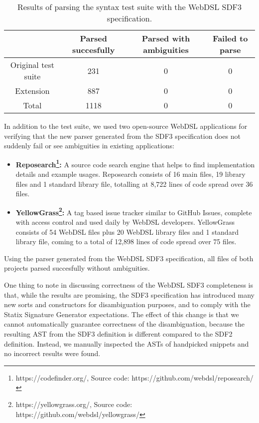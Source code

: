     \begin{table}[h]
      \centering
      \begin{tabular}{ | c || c | c | c | }
        \hline
        & Parsed succesfully & Parsed with ambiguities & Failed to parse \\
        \hline
        Original test suite & 231 & 0 & 0 \\
        \hline
        Extension & 887 & 0 & 0 \\
        \hline\hline
        Total & 1118 & 0 & 0 \\
        \hline
      \end{tabular}
      \caption{\label{tbl:syntax-correctness-suite-results}Results of parsing the syntax test suite with the WebDSL SDF3 specification.}
    \end{table}

    In addition to the test suite, we used two open-source WebDSL applications for verifying that the new parser generated from the SDF3 specification does not suddenly fail or see ambiguities in existing applications:

    \begin{itemize}
      \item \textbf{Reposearch\footnote{https://codefinder.org/, Source code: https://github.com/webdsl/reposearch/}:} A source code search engine that helps to find implementation details and example usages. Reposearch consists of 16 main files, 19 library files and 1 standard library file, totalling at 8,722 lines of code spread over 36 files.
      \item \textbf{YellowGrass\footnote{https://yellowgrass.org/, Source code: https://github.com/webdsl/yellowgrass/}:} A tag based issue tracker similar to GitHub Issues, complete with access control and used daily by WebDSL developers. YellowGrass consists of 54 WebDSL files plus 20 WebDSL library files and 1 standard library file, coming to a total of 12,898 lines of code spread over 75 files.
    \end{itemize}

    Using the parser generated from the WebDSL SDF3 specification, all files of both projects parsed succesfully without ambiguities.

    One thing to note in discussing correctness of the WebDSL SDF3 completeness is that, while the results are promising, the SDF3 specification has introduced many new sorts and constructors for disambiguation purposes, and to comply with the Statix Signature Generator expectations. The effect of this change is that we cannot automatically guarantee correctness of the disambiguation, because the resulting AST from the SDF3 definition is different compared to the SDF2 definition. Instead, we manually inspected the ASTs of handpicked snippets and no incorrect results were found.

